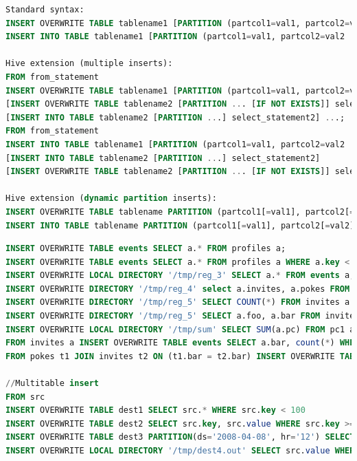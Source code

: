 \begin{lstlisting}[language=sql,basicstyle=\tiny,caption=Syntax DML Insert]
Standard syntax:
INSERT OVERWRITE TABLE tablename1 [PARTITION (partcol1=val1, partcol2=val2 ...) [IF NOT EXISTS]] select_statement1 FROM from_statement;
INSERT INTO TABLE tablename1 [PARTITION (partcol1=val1, partcol2=val2 ...)] select_statement1 FROM from_statement;
 
Hive extension (multiple inserts):
FROM from_statement
INSERT OVERWRITE TABLE tablename1 [PARTITION (partcol1=val1, partcol2=val2 ...) [IF NOT EXISTS]] select_statement1
[INSERT OVERWRITE TABLE tablename2 [PARTITION ... [IF NOT EXISTS]] select_statement2]
[INSERT INTO TABLE tablename2 [PARTITION ...] select_statement2] ...;
FROM from_statement
INSERT INTO TABLE tablename1 [PARTITION (partcol1=val1, partcol2=val2 ...)] select_statement1
[INSERT INTO TABLE tablename2 [PARTITION ...] select_statement2]
[INSERT OVERWRITE TABLE tablename2 [PARTITION ... [IF NOT EXISTS]] select_statement2] ...;
 
Hive extension (dynamic partition inserts):
INSERT OVERWRITE TABLE tablename PARTITION (partcol1[=val1], partcol2[=val2] ...) select_statement FROM from_statement;
INSERT INTO TABLE tablename PARTITION (partcol1[=val1], partcol2[=val2] ...) select_statement FROM from_statement;
\end{lstlisting}

\begin{lstlisting}[language=sql,basicstyle=\tiny,caption=Contoh DML Insert]
INSERT OVERWRITE TABLE events SELECT a.* FROM profiles a;
INSERT OVERWRITE TABLE events SELECT a.* FROM profiles a WHERE a.key < 100;
INSERT OVERWRITE LOCAL DIRECTORY '/tmp/reg_3' SELECT a.* FROM events a;
INSERT OVERWRITE DIRECTORY '/tmp/reg_4' select a.invites, a.pokes FROM profiles a;
INSERT OVERWRITE DIRECTORY '/tmp/reg_5' SELECT COUNT(*) FROM invites a WHERE a.ds='2008-08-15';
INSERT OVERWRITE DIRECTORY '/tmp/reg_5' SELECT a.foo, a.bar FROM invites a;
INSERT OVERWRITE LOCAL DIRECTORY '/tmp/sum' SELECT SUM(a.pc) FROM pc1 a;
FROM invites a INSERT OVERWRITE TABLE events SELECT a.bar, count(*) WHERE a.foo > 0 GROUP BY a.bar;
FROM pokes t1 JOIN invites t2 ON (t1.bar = t2.bar) INSERT OVERWRITE TABLE events SELECT t1.bar, t1.foo, t2.foo;

//Multitable insert
FROM src
INSERT OVERWRITE TABLE dest1 SELECT src.* WHERE src.key < 100
INSERT OVERWRITE TABLE dest2 SELECT src.key, src.value WHERE src.key >= 100 and src.key < 200
INSERT OVERWRITE TABLE dest3 PARTITION(ds='2008-04-08', hr='12') SELECT src.key WHERE src.key >= 200 and src.key < 300
INSERT OVERWRITE LOCAL DIRECTORY '/tmp/dest4.out' SELECT src.value WHERE src.key >= 300;
\end{lstlisting}


